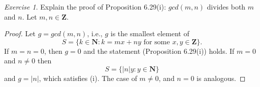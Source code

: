 \documentclass[12pt,oneside]{amsart}
\theoremstyle{remark}
\newtheorem{exer}{Exercise}
\newcommand{\bfN}{\mathbf{N}}
\newcommand{\bfZ}{\mathbf{Z}}
\begin{document}
%
%
%
%
\newpage
\begin{exer}
Explain the proof of Proposition 6.29(i): $gcd(m, n)$ divides both $m$ and $n$. Let $m,n \in \bfZ$. %
\end{exer}

\begin{proof}
Let $g = gcd(m, n)$, i.e., $g$ is the smallest element of \[ S = \{k \in \bfN : k = mx + ny \text{ for some } x,y \in \bfZ \}. \] If $m = n = 0$, then $g = 0$ and the statement (Proposition 6.29(i)) holds. If $m = 0$ and $n \neq 0$ then \[ S = \{ |n|y : y \in \bfN \} \] and $g = |n|$, which satisfies (i). The case of $m \neq 0$, and $n = 0$ is analogous.
\end{proof}
\end{document}
